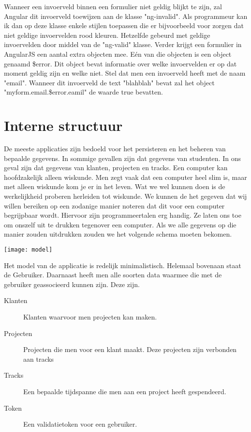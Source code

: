 \documentclass[a4paper,11pt]{article}
\begin{document}
Wanneer een invoerveld binnen een formulier niet geldig blijkt te zijn, zal Angular dit invoerveld toewijzen aan de klasse "ng-invalid". Als programmeur kan ik dan op deze klasse enkele stijlen toepassen die er bijvoorbeeld voor zorgen dat niet geldige invoervelden rood kleuren. Hetzelfde gebeurd met geldige invoervelden door middel van de "ng-valid" klasse. Verder krijgt een formulier in AngularJS een aantal extra objecten mee. Eén van die objecten is een object genaamd \$error. Dit object bevat informatie over welke invoervelden er op dat moment geldig zijn en welke niet. Stel dat men een invoerveld heeft met de naam "email". Wanneer dit invoerveld de text "blahblah" bevat zal het object "myform.email.\$error.eamil" de waarde true bevatten.


\section{Interne structuur} %
De meeste applicaties zijn bedoeld voor het persisteren en het beheren van bepaalde gegevens. In sommige gevallen zijn dat gegevens van studenten. In ons geval zijn dat gegevens van klanten, projecten en tracks. Een computer kan hoofdzakelijk alleen wiskunde. Men zegt vaak dat een computer heel slim is, maar met alleen wiskunde kom je er in het leven. Wat we wel kunnen doen is de werkelijkheid proberen herleiden tot wiskunde. We kunnen de het gegeven dat wij willen bereiken op een zodanige manier noteren dat dit voor een computer begrijpbaar wordt. Hiervoor zijn programmeertalen erg handig. Ze laten ons toe om onszelf uit te drukken tegenover een computer. Als we alle gegevens op die manier zouden uitdrukken zouden we het volgende schema moeten bekomen.

\begin{center}
\begin{minipage}{\linewidth}
\centering
\texttt{[image: model]}
\end{minipage}
\end{center}

Het model van de applicatie is redelijk minimalistisch. Helemaal bovenaan staat de Gebruiker. Daarnaast heeft men alle soorten data waarmee die met de gebruiker geassocieerd kunnen zijn. Deze zijn.
\begin{description}
\item[Klanten] Klanten waarvoor men projecten kan maken.
\item[Projecten] Projecten die men voor een klant maakt. Deze projecten zijn verbonden aan tracks
\item[Tracks] Een bepaalde tijdspanne die men aan een project heeft gespendeerd.
\item[Token] Een validatietoken voor een gebruiker.
\end{description}
\end{document}
